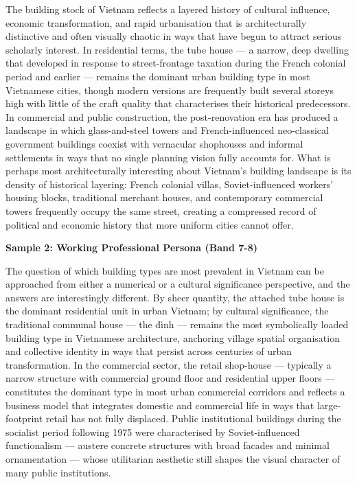 The building stock of Vietnam reflects a layered history of cultural influence, economic transformation, and rapid urbanisation that is architecturally distinctive and often visually chaotic in ways that have begun to attract serious scholarly interest. In residential terms, the tube house — a narrow, deep dwelling that developed in response to street-frontage taxation during the French colonial period and earlier — remains the dominant urban building type in most Vietnamese cities, though modern versions are frequently built several storeys high with little of the craft quality that characterises their historical predecessors. In commercial and public construction, the post-renovation era has produced a landscape in which glass-and-steel towers and French-influenced neo-classical government buildings coexist with vernacular shophouses and informal settlements in ways that no single planning vision fully accounts for. What is perhaps most architecturally interesting about Vietnam's building landscape is its density of historical layering: French colonial villas, Soviet-influenced workers' housing blocks, traditional merchant houses, and contemporary commercial towers frequently occupy the same street, creating a compressed record of political and economic history that more uniform cities cannot offer.

\textbf{Sample 2: Working Professional Persona (Band 7-8)}

The question of which building types are most prevalent in Vietnam can be approached from either a numerical or a cultural significance perspective, and the answers are interestingly different. By sheer quantity, the attached tube house is the dominant residential unit in urban Vietnam; by cultural significance, the traditional communal house — the đình — remains the most symbolically loaded building type in Vietnamese architecture, anchoring village spatial organisation and collective identity in ways that persist across centuries of urban transformation. In the commercial sector, the retail shop-house — typically a narrow structure with commercial ground floor and residential upper floors — constitutes the dominant type in most urban commercial corridors and reflects a business model that integrates domestic and commercial life in ways that large-footprint retail has not fully displaced. Public institutional buildings during the socialist period following 1975 were characterised by Soviet-influenced functionalism — austere concrete structures with broad facades and minimal ornamentation — whose utilitarian aesthetic still shapes the visual character of many public institutions.

